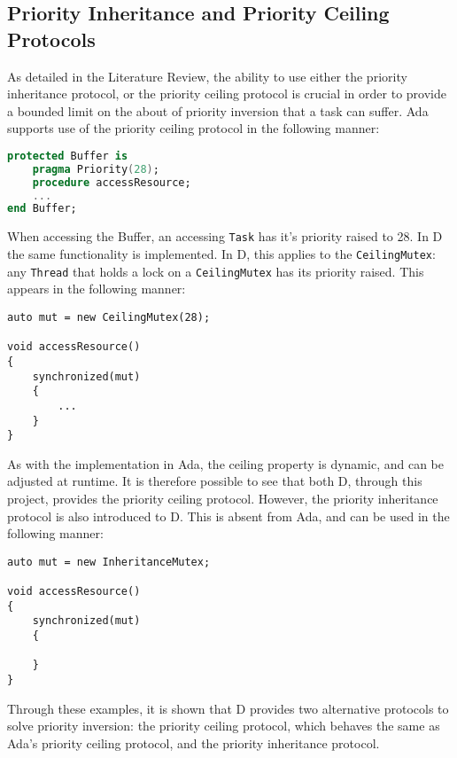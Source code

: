 \subsection{Priority Inheritance and Priority Ceiling Protocols}
As detailed in the Literature Review, the ability to use either the priority
inheritance protocol, or the priority ceiling protocol is crucial in order to
provide a bounded limit on the about of priority inversion that a task can
suffer. Ada supports use of the priority ceiling protocol in the following
manner: 
\begin{lstlisting}[language=Ada]
protected Buffer is 
    pragma Priority(28); 
    procedure accessResource; 
    ...
end Buffer; 
\end{lstlisting}
When accessing the Buffer, an accessing \texttt{Task} has it's priority raised
to 28. In D the same functionality is implemented. In D, this applies to
the \texttt{CeilingMutex}: any \texttt{Thread} that holds a lock on a
\texttt{CeilingMutex} has its priority raised. This appears in the following
manner: 
\begin{lstlisting}
auto mut = new CeilingMutex(28); 

void accessResource()
{
    synchronized(mut)
    {
        ...
    }
}
\end{lstlisting}
As with the implementation in Ada, the ceiling property is dynamic, and can be
adjusted at runtime. It is therefore possible to see that both D, through this
project, provides the priority ceiling protocol. However, the priority
inheritance protocol is also introduced to D. This is absent from Ada, and can
be used in the following manner: 
\begin{lstlisting}
auto mut = new InheritanceMutex; 

void accessResource()
{
    synchronized(mut)
    {

    }
}
\end{lstlisting}
Through these examples, it is shown that D provides two alternative protocols
to solve priority inversion: the priority ceiling protocol, which behaves the
same as Ada's priority ceiling protocol, and the priority inheritance protocol. 

